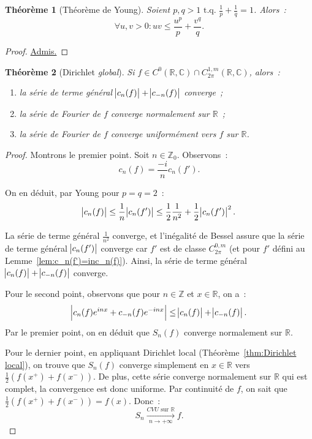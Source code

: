 \documentclass{report}
\newtheorem{thm}{Théorème}[chapter]
\theoremstyle{definition}
\theoremstyle{remark}
\numberwithin{equation}{section}
\newcommand{\C}{\mathbb C}
\newcommand{\R}{\mathbb R}
\newcommand{\Z}{\mathbb Z}
\newcommand{\tq}{\text{ t.q. }}
\newcommand{\CONV}[5]{\xrightarrow[#2 \to #3]{#4 \text{ #5 } #1}}
\newcommand{\CVU}[3]{\CONV{#1}{#2}{#3}{CVU}{sur}}
\newcommand{\pinfty}{{+\infty}}
\newcommand{\grantedproof}{\begin{proof} \underline{Admis.} \end{proof}}
\newcommand{\CmT}[2]{C^{#1,m}_{#2}}
\newcommand{\CzmT}[1]{\CmT 0{#1}}
\newcommand{\Czm}{\CzmT{2\pi}}
\newcommand{\ComT}[1]{\CmT 1{#1}}
\newcommand{\Com}{\ComT {2\pi}}
\begin{document}
			\begin{thm}[Théorème de Young] Soient $p, q > 1 \tq \frac 1p + \frac 1q = 1$. Alors~:
			\begin{equation}
				\forall u, v > 0 : uv \leq \frac {u^p}p + \frac {v^q}q.
			\end{equation}
			\end{thm}

			\grantedproof

			\begin{thm}[Dirichlet \textit{global}] Si $f \in C^0(\R, \C) \cap \Com(\R, \C)$, alors~:
			\begin{enumerate}
				\item la série de terme général $\abs {c_n(f)} + \abs {c_{-n}(f)}$ converge~;
				\item la série de Fourier de $f$ converge normalement sur $\R$~;
				\item la série de Fourier de $f$ converge uniformément vers $f$ sur $\R$.
			\end{enumerate}
			\end{thm}

			\begin{proof} Montrons le premier point. Soit $n \in \Z_0$. Observons~:
			\begin{equation}
				c_n(f) = \frac {-i}nc_n(f').
			\end{equation}

			On en déduit, par Young pour $p=q=2$~:
			\begin{equation}
				\abs {c_n(f)} \leq \frac 1n\abs {c_n(f')} \leq \frac 12\frac 1{n^2} + \frac 12\abs {c_n(f')}^2.
			\end{equation}

			La série de terme général $\frac 1{n^2}$ converge, et l'inégalité de Bessel assure que la série de terme général $\abs {c_n(f')}$ converge car $f'$ est
			de classe $\Czm$ (et pour $f'$ défini au Lemme~\ref{lem:c_n(f')=inc_n(f)}). Ainsi, la série de terme général $\abs {c_n(f)} + \abs {c_{-n}(f)}$ converge.

			Pour le second point, observons que pour $n \in \Z$ et $x \in \R$, on a~:
			\begin{equation}
				\abs {c_n(f)e^{inx} + c_{-n}(f)e^{-inx}} \leq \abs {c_n(f)} + \abs {c_{-n}(f)}.
			\end{equation}
			Par le premier point, on en déduit que $S_n(f)$ converge normalement sur $\R$.

			Pour le dernier point, en appliquant Dirichlet local (Théorème~\ref{thm:Dirichlet local}), on trouve que $S_n(f)$ converge simplement en $x \in \R$
			vers $\frac 12(f(x^+)+f(x^-))$. De plus, cette série converge normalement sur $\R$ qui est complet, la convergence est donc uniforme. Par continuité de $f$,
			on sait que $\frac 12(f(x^+)+f(x^-)) = f(x)$. Donc~:
			\begin{equation}
				S_n \CVU \R n\pinfty f.
			\end{equation}
			\end{proof}
\end{document}
